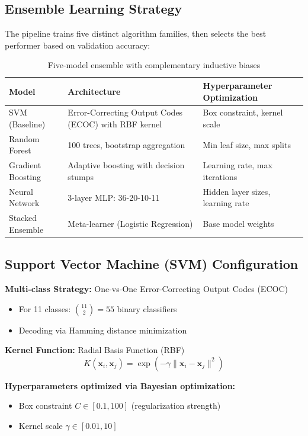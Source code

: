 \documentclass[11pt,a4paper]{article}
\begin{document}
\subsection{Ensemble Learning Strategy}

The pipeline trains five distinct algorithm families, then selects the best performer based on validation accuracy:

\begin{table}[h]
\centering
\small
\begin{tabular}{@{}p{3.2cm}p{4.5cm}p{4.5cm}@{}}
\toprule
\textbf{Model} & \textbf{Architecture} & \textbf{Hyperparameter Optimization} \\
\midrule
SVM (Baseline) & Error-Correcting Output Codes (ECOC) with RBF kernel & Box constraint, kernel scale \\
Random Forest & 100 trees, bootstrap aggregation & Min leaf size, max splits \\
Gradient Boosting & Adaptive boosting with decision stumps & Learning rate, max iterations \\
Neural Network & 3-layer MLP: 36-20-10-11 & Hidden layer sizes, learning rate \\
Stacked Ensemble & Meta-learner (Logistic Regression) & Base model weights \\
\bottomrule
\end{tabular}
\caption{Five-model ensemble with complementary inductive biases}
\end{table}

\subsection{Support Vector Machine (SVM) Configuration}

\textbf{Multi-class Strategy:} One-vs-One Error-Correcting Output Codes (ECOC)
\begin{itemize}[itemsep=0.2em]
    \item For 11 classes: ${11 \choose 2} = 55$ binary classifiers
    \item Decoding via Hamming distance minimization
\end{itemize}

\textbf{Kernel Function:} Radial Basis Function (RBF)
\begin{equation}
K(\mathbf{x}_i, \mathbf{x}_j) = \exp\left(-\gamma \|\mathbf{x}_i - \mathbf{x}_j\|^2\right)
\end{equation}

\textbf{Hyperparameters optimized via Bayesian optimization:}
\begin{itemize}[itemsep=0.2em]
    \item Box constraint $C \in [0.1, 100]$ (regularization strength)
    \item Kernel scale $\gamma \in [0.01, 10]$
\end{itemize}
\end{document}

